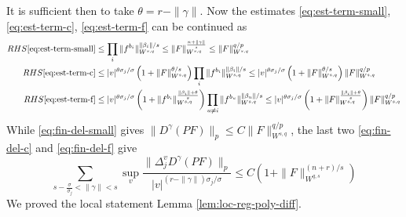 It is sufficient then to take \(\theta = r- \|\gamma\|\). Now the estimates
\eqref{eq:est-term-small}, \eqref{eq:est-term-c}, \eqref{eq:est-term-f} can be continued as
\begin{align}
  RHS \eqref{eq:est-term-small} &\leq \prod_i \|f^{b_i}\|^{\|\beta_i\|/s}_{W^{s,q}} \leq \|F\|_{W^{s,q}}^{\frac{n+\|\gamma\|}{s}} \leq \|F\|_{W^{s,q}}^{q/p}\label{eq:fin-del-small}\\
  RHS \eqref{eq:est-term-c} &\leq |v|^{\theta\sigma_j/\sigma}\left( 1 + \|F\|_{W^{s,q}}^{\theta/s} \right)\prod_i \|f^{b_i}\|^{\|\beta_i\|/s}_{W^{s,q}}\leq |v|^{\theta\sigma_j/\sigma}\left( 1 + \|F\|_{W^{s,q}}^{\theta/s} \right)\|F\|_{W^{s,q}}^{q/p} \label{eq:fin-del-c}\\
  RHS \eqref{eq:est-term-f} &\leq |v|^{\theta\sigma_j/\sigma}\left( 1 + \|f^{b_i}\|_{W^{s,q}}^{\frac{\|\beta_i\| +\theta}{s}} \right)\prod_{u\ne i} \|f^{b_u}\|^{\|\beta_u\|/s}_{W^{s,q}}\leq |v|^{\theta\sigma_j/\sigma}\left( 1 + \|F\|_{W^{s,q}}^{\frac{\|\beta_i\| +\theta}{s}} \right)\|F\|_{W^{s,q}}^{q/p} \label{eq:fin-del-f}
\end{align}
While \eqref{eq:fin-del-small} gives \(\|D^\gamma (PF)\|_p \leq C \|F\|_{W^{s,q}}^{q/p}\),
the last two \eqref{eq:fin-del-c} and \eqref{eq:fin-del-f} give
\[
 \sum_{ s- \frac{\sigma}{\sigma_j} < \|\gamma\| < s}\sup_{v} \frac{\|\Delta^v_j D^\gamma (PF) \|_p}{|v|^{(r-\|\gamma\|)\sigma_j/\sigma}} \leq C \left(
1 + \|F\|^{(n+r)/s}_{W^{q,s}}\right)
\]
We proved the local statement Lemma \ref{lem:loc-reg-poly-diff}.

